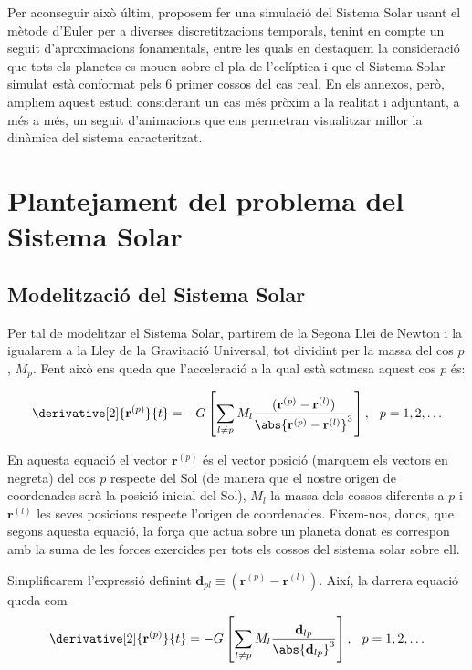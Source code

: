\documentclass[10pt, twoside, a4paper]{article}
\begin{document}
Per aconseguir això últim, proposem fer una simulació del Sistema Solar usant el mètode d'Euler per a diverses discretitzacions temporals, tenint en compte un seguit d'aproximacions fonamentals, entre les quals en destaquem la consideració que tots els planetes es mouen sobre el pla de l'eclíptica i que el Sistema Solar simulat està conformat pels 6 primer cossos del cas real. En els annexos, però, ampliem aquest estudi considerant un cas més pròxim a la realitat i adjuntant, a més a més, un seguit d'animacions que ens permetran visualitzar millor la dinàmica del sistema caracteritzat. 

\section{Plantejament del problema del Sistema Solar}

\subsection{Modelització del Sistema Solar}
Per tal de modelitzar el Sistema Solar, partirem de la Segona Llei de Newton i la igualarem a la Lley de la Gravitació Universal, tot dividint per la massa del cos $p$, $M_p$. Fent això ens queda que l'acceleració a la qual està sotmesa aquest cos $p$ és:

\begin{equation}
    \derivative[2]{\mathbf{r}^{(p)}}{t} = - G \left[ \sum_{l \neq p} M_l \frac{(\mathbf{r}^{(p)}-\mathbf{r}^{(l)})}{\abs{\mathbf{r}^{(p)} - \mathbf{r}^{(l)}}^3}\right], \hspace{0.25cm} p = 1, 2, \ldots 
\end{equation}

En aquesta equació el vector $\mathbf{r}^{(p)}$ és el vector posició (marquem els vectors en negreta) del cos $p$ respecte del Sol (de manera que el nostre origen de coordenades serà la posició inicial del Sol), $M_l$ la massa dels cossos diferents a $p$ i $\mathbf{r}^{(l)}$ les seves posicions respecte l'origen de coordenades. Fixem-nos, doncs, que segons aquesta equació, la força que actua sobre un planeta donat es correspon amb la suma de les forces exercides per tots els cossos del sistema solar sobre ell. 

Simplificarem l'expressió definint $\mathbf{d}_{pl} \equiv (\mathbf{r}^{(p)}-\mathbf{r}^{(l)})$. Així, la darrera equació queda com
\begin{equation}
    \derivative[2]{\mathbf{r}^{(p)}}{t} = - G \left[ \sum_{l \neq p} M_l \frac{\mathbf{d}_{lp}}{\abs{\mathbf{d}_{lp}}^3}\right], \hspace{0.25cm} p = 1, 2, \ldots 
\end{equation}
\end{document}
